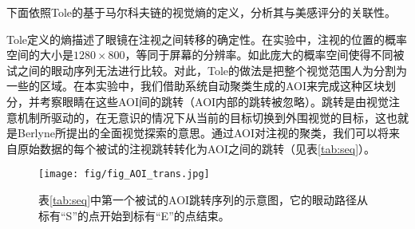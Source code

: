 \documentclass[master, fontset=mac, openany, oneside, zihao=-4]{sjtuthesis}
\begin{document}
下面依照Tole的基于马尔科夫链的视觉熵的定义，分析其与美感评分的关联性。

Tole定义的熵描述了眼镜在注视之间转移的确定性。在实验中，注视的位置的概率空间的大小是$1280\times800$，等同于屏幕的分辨率。如此庞大的概率空间使得不同被试之间的眼动序列无法进行比较。对此，Tole的做法是把整个视觉范围人为分割为一些的区域。在本实验中，我们借助系统自动聚类生成的AOI来完成这种区块划分，并考察眼睛在这些AOI间的跳转（AOI内部的跳转被忽略）。跳转是由视觉注意机制所驱动的，在无意识的情况下从当前的目标切换到外围视觉的目标\cite{Henderson1993}，这也就是Berlyne\cite{Berlyne1971}所提出的全面视觉探索的意思。通过AOI对注视的聚类，我们可以将来自原始数据的每个被试的注视跳转转化为AOI之间的跳转（见表\ref{tab:seq}）。

\begin{figure}[H]
  \label{fig:AOI-trans}
  \centering
  \texttt{[image: fig/fig\_AOI\_trans.jpg]}
  \caption{表\ref{tab:seq}中第一个被试的AOI跳转序列的示意图，它的眼动路径从标有“S”的点开始到标有“E”的点结束。}
\end{figure}
\end{document}
